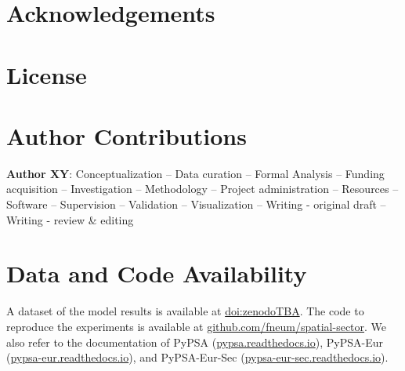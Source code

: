 \documentclass[12pt,preprint]{elsarticle}
\begin{document}


\section*{Acknowledgements}
\small


\section*{License}

\section*{Author Contributions}


\textbf{Author XY}:
Conceptualization --
Data curation --
Formal Analysis --
Funding acquisition --
Investigation --
Methodology --
Project administration --
Resources --
Software --
Supervision --
Validation --
Visualization --
Writing - original draft --
Writing - review \& editing


\section*{Data and Code Availability}

A dataset of the model results is available at \href{zenodoTBA}{doi:zenodoTBA}.
The code to reproduce the experiments is available at \href{https://github.com/fneum/spatial-sector}{github.com/fneum/spatial-sector}.
We also refer to the documentation of PyPSA (\href{https://pypsa.readthedocs.io}{pypsa.readthedocs.io}),
PyPSA-Eur (\href{https://pypsa-eur.readthedocs.io}{pypsa-eur.readthedocs.io}), and
PyPSA-Eur-Sec (\href{https://pypsa-eur-sec.readthedocs.io}{pypsa-eur-sec.readthedocs.io}).

\renewcommand{\ttdefault}{\sfdefault}
%



\newpage

\makeatletter
\renewcommand \thesection{S\@arabic\c@section}
\renewcommand\thetable{S\@arabic\c@table}
\renewcommand \thefigure{S\@arabic\c@figure}
\makeatother

\renewcommand{\citenumfont}[1]{S#1}

\setcounter{equation}{0}
\setcounter{figure}{0}
\setcounter{table}{0}
\setcounter{section}{0}



\renewcommand{\ttdefault}{\sfdefault}

\begin{small}
	\tableofcontents
\end{small}
~\\
\end{document}
